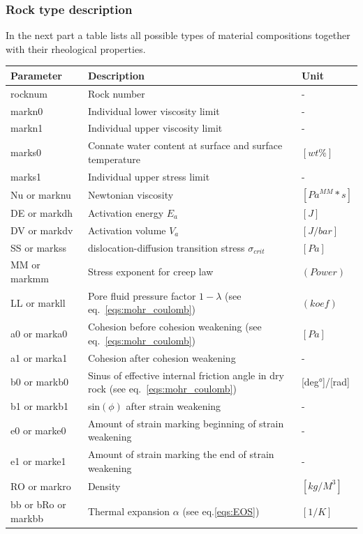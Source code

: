 \subsubsection{Rock type description}

In the next part a table lists all possible types of material compositions together with their rheological properties.

\begin{table}[H]
\small
\centering
\begin{tabular}{l p{8cm} l}
\toprule
Parameter & Description & Unit\\
\midrule
rocknum & Rock number & - \\ 
markn0 & Individual lower viscosity limit & - \\ 
markn1 & Individual upper viscosity limit & - \\ 
marks0 & Connate water content at surface and surface temperature & $[wt\%]$ \\ 
marks1 & Individual upper stress limit & - \\ 
Nu or marknu & Newtonian viscosity & $[Pa^{MM}*s]$ \\ 
DE or markdh & Activation energy $E_a$ & $[J]$\\ 
DV or markdv & Activation volume $V_a$ & $[J/bar]$ \\ 
SS or markss & dislocation-diffusion transition stress $\sigma_{crit}$ & $[Pa]$ \\ 
MM or markmm & Stress exponent for creep law & $(Power)$ \\ 
LL or markll & Pore fluid pressure factor $1-\lambda$ (see eq.~\ref{eqs:mohr_coulomb}) & $(koef)$ \\ 
a0 or marka0 & Cohesion before cohesion weakening (see eq.~\ref{eqs:mohr_coulomb}) & $[Pa]$ \\
a1 or marka1 & Cohesion after cohesion weakening & - \\
b0 or markb0 & Sinus of effective internal friction angle in dry rock (see eq.~\ref{eqs:mohr_coulomb}) & [deg°]/[rad] \\
b1 or markb1 & sin$(\phi)$ after strain weakening & - \\
e0 or marke0 & Amount of strain marking beginning of strain weakening  & - \\
e1 or marke1 & Amount of strain marking the end of strain weakening  & - \\ 
RO or markro & Density & $[kg/M^3]$ \\ 
bb or bRo or markbb & Thermal expansion $\alpha$ (see eq.\ref{eqs:EOS}) & $[1/K]$ \\ 

\end{tabular}
\end{table}
